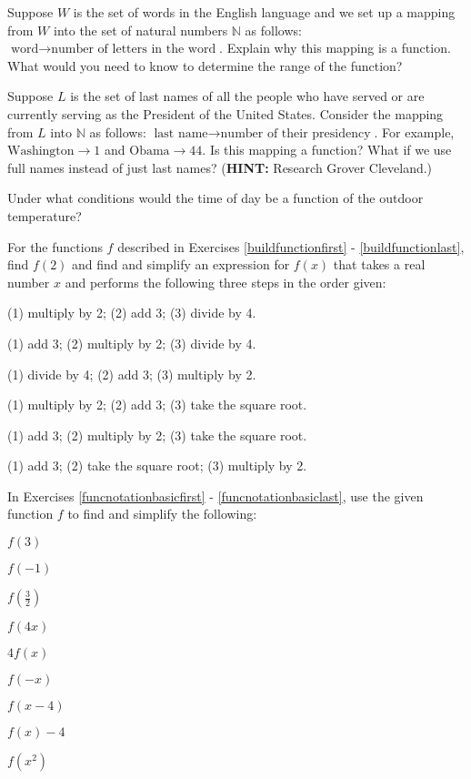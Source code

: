 \begin{exenum}

\item    Suppose $W$ is the set of words in the English language and we set up a mapping from $W$ into the set of natural numbers $\mathbb{N}$ as follows: $\text{word} \rightarrow \text{number of letters in the word}$.  Explain why this mapping is a function.  What would you need to know to determine the range of the function?

\item  Suppose $L$ is the set of last names of all the people who have served or are currently serving as the President of the United States.   Consider the mapping from $L$ into $\mathbb{N}$ as follows:  $\text{last name} \rightarrow \text{number of their presidency}$.  For example,  $\text{Washington} \rightarrow 1$ and $\text{Obama} \rightarrow 44$.  Is this mapping a function?  What if we use full names instead of just last names? (\textbf{HINT:}  Research Grover Cleveland.)

\item  Under what conditions would the time of day be a function of the outdoor temperature?

\end{exenum}


For the functions $f$ described in Exercises \ref{buildfunctionfirst} - \ref{buildfunctionlast}, find $f(2)$ and find and simplify an expression for $f(x)$ that takes a real number $x$ and performs the following three steps in the order given: 

\begin{exenum}
\item  (1) multiply by 2; (2) add 3; (3) divide by 4. \label{buildfunctionfirst}
\item  (1) add 3; (2) multiply by 2; (3) divide by 4. 
\item (1) divide by 4; (2) add 3; (3) multiply by 2.
\item (1) multiply by 2; (2) add 3; (3) take the square root.
\item  (1) add 3; (2) multiply by 2; (3) take the square root.
\item  (1) add 3; (2) take the square root; (3) multiply by 2.  \label{buildfunctionlast}
\end{exenum}

In Exercises \ref{funcnotationbasicfirst} - \ref{funcnotationbasiclast}, use the given function $f$ to find and simplify the following:

\begin{shortitemize}
\item $f(3)$
\item $f(-1)$
\item $f\left(\frac{3}{2} \right)$
\item  $f(4x)$
\item $4f(x)$
\item $f(-x)$
\item  $f(x-4)$
\item $f(x) - 4$
\item  $f\left(x^2\right)$
\end{shortitemize}

